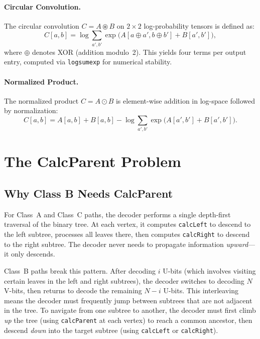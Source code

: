 \documentclass[11pt,a4paper]{article}
\newcommand{\circonv}{\circledast}
\newcommand{\normprod}{\odot}
\begin{document}
\paragraph{Circular Convolution.} The circular convolution $C = A \circonv B$ on $2 \times 2$ log-probability tensors is defined as:
\begin{equation}
    C[a, b] = \log \sum_{a', b'} \exp\bigl(A[a \oplus a', b \oplus b'] + B[a', b']\bigr),
    \label{eq:circ_conv}
\end{equation}
where $\oplus$ denotes XOR (addition modulo~2). This yields four terms per output entry, computed via \texttt{logsumexp} for numerical stability.

\paragraph{Normalized Product.} The normalized product $C = A \normprod B$ is element-wise addition in log-space followed by normalization:
\begin{equation}
    C[a, b] = A[a, b] + B[a, b] - \log \sum_{a', b'} \exp\bigl(A[a', b'] + B[a', b']\bigr).
\end{equation}

\section{The CalcParent Problem}
\label{sec:calcparent_problem}

\subsection{Why Class B Needs CalcParent}

For Class~A and Class~C paths, the decoder performs a single depth-first traversal of the binary tree. At each vertex, it computes \texttt{calcLeft} to descend to the left subtree, processes all leaves there, then computes \texttt{calcRight} to descend to the right subtree. The decoder never needs to propagate information \emph{upward}---it only descends.

Class~B paths break this pattern. After decoding $i$ U-bits (which involves visiting certain leaves in the left and right subtrees), the decoder switches to decoding $N$ V-bits, then returns to decode the remaining $N - i$ U-bits. This interleaving means the decoder must frequently jump between subtrees that are not adjacent in the tree. To navigate from one subtree to another, the decoder must first climb \emph{up} the tree (using \texttt{calcParent} at each vertex) to reach a common ancestor, then descend \emph{down} into the target subtree (using \texttt{calcLeft} or \texttt{calcRight}).
\end{document}
